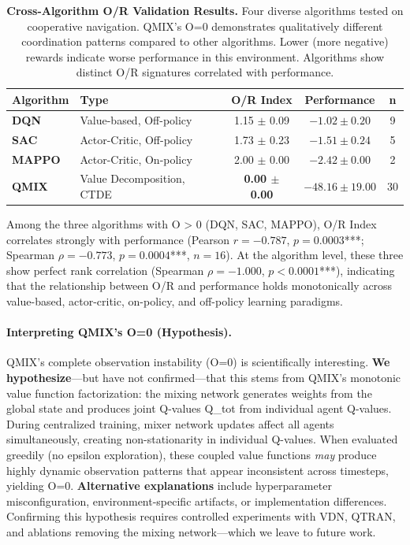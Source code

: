 \begin{table}[H]
\centering
\caption{\textbf{Cross-Algorithm O/R Validation Results.} Four diverse algorithms tested on cooperative navigation. QMIX's O=0 demonstrates qualitatively different coordination patterns compared to other algorithms. Lower (more negative) rewards indicate worse performance in this environment. Algorithms show distinct O/R signatures correlated with performance.}
\label{tab:cross_algorithm}
\begin{tabular}{llccc}
\toprule
\textbf{Algorithm} & \textbf{Type} & \textbf{O/R Index} & \textbf{Performance} & \textbf{n} \\
\midrule
\textbf{DQN} & Value-based, Off-policy & 1.15 $\pm$ 0.09 & $-1.02 \pm 0.20$ & 9 \\
\textbf{SAC} & Actor-Critic, Off-policy & 1.73 $\pm$ 0.23 & $-1.51 \pm 0.24$ & 5 \\
\textbf{MAPPO} & Actor-Critic, On-policy & 2.00 $\pm$ 0.00 & $-2.42 \pm 0.00$ & 2 \\
\textbf{QMIX} & Value Decomposition, CTDE & \textbf{0.00 $\pm$ 0.00} & $-48.16 \pm 19.00$ & 30 \\
\bottomrule
\end{tabular}
\end{table}

Among the three algorithms with O > 0 (DQN, SAC, MAPPO), O/R Index correlates strongly with performance (Pearson $r = -0.787$, $p = 0.0003$***; Spearman $\rho = -0.773$, $p = 0.0004$***, $n=16$). At the algorithm level, these three show perfect rank correlation (Spearman $\rho = -1.000$, $p < 0.0001$***), indicating that the relationship between O/R and performance holds monotonically across value-based, actor-critic, on-policy, and off-policy learning paradigms.

\paragraph{Interpreting QMIX's O=0 (Hypothesis).}
QMIX's complete observation instability (O=0) is scientifically interesting. \textbf{We hypothesize}---but have not confirmed---that this stems from QMIX's monotonic value function factorization: the mixing network generates weights from the global state and produces joint Q-values Q\_tot from individual agent Q-values. During centralized training, mixer network updates affect all agents simultaneously, creating non-stationarity in individual Q-values. When evaluated greedily (no epsilon exploration), these coupled value functions \textit{may} produce highly dynamic observation patterns that appear inconsistent across timesteps, yielding O=0. \textbf{Alternative explanations} include hyperparameter misconfiguration, environment-specific artifacts, or implementation differences. Confirming this hypothesis requires controlled experiments with VDN, QTRAN, and ablations removing the mixing network---which we leave to future work.

